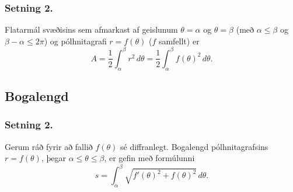  \subsubsection{Setning 2.}
  Flatarmál svæðisins sem afmarkast af geislunum 
$\theta=\alpha$ og $\theta=\beta$ (með $\alpha\leq \beta$ og $\beta-\alpha\leq 2\pi$) og pólhnitagrafi $r=f(\theta)$ ($f$ samfellt) er
$$A=\frac{1}{2}\int_\alpha^\beta r^2\,d\theta
=\frac{1}{2}\int_\alpha^\beta f(\theta)^2\,d\theta.$$
 



\subsection{Bogalengd}
 \subsubsection{Setning 2.}
   Gerum ráð fyrir að fallið $f(\theta)$ sé diffranlegt. Bogalengd pólhnitagrafsins $r=f(\theta)$, þegar $\alpha\leq\theta\leq\beta$, er gefin með formúlunni 
$$s=\int_\alpha^\beta \sqrt{f'(\theta)^2+f(\theta)^2}\,d\theta.$$
 






